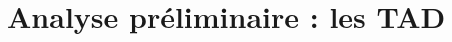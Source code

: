 \documentclass[10pt]{article}
\begin{document}
    \section{Analyse préliminaire : les TAD}
        
        
        
        
        
        
        
        
        
        
\end{document}
